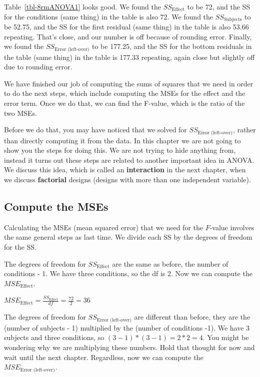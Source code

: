 \documentclass[
  letterpaper,
  DIV=11,
  numbers=noendperiod]{scrreprt}
\begin{document}
Table~\ref{tbl-8rmANOVA1} looks good. We found the \(SS_\text{Effect}\)
to be 72, and the SS for the conditions (same thing) in the table is
also 72. We found the \(SS_\text{Subjects}\) to be 52.75, and the SS for
the first residual (same thing) in the table is also 53.66 repeating.
That's close, and our number is off because of rounding error. Finally,
we found the \(SS_\text{Error (left-over)}\) to be 177.25, and the SS
for the bottom residuals in the table (same thing) in the table is
177.33 repeating, again close but slightly off due to rounding error.

We have finished our job of computing the sums of squares that we need
in order to do the next steps, which include computing the MSEs for the
effect and the error term. Once we do that, we can find the F-value,
which is the ratio of the two MSEs.

Before we do that, you may have noticed that we solved for
\(SS_\text{Error (left-over)}\), rather than directly computing it from
the data. In this chapter we are not going to show you the steps for
doing this. We are not trying to hide anything from, instead it turns
out these steps are related to another important idea in ANOVA. We
discuss this idea, which is called an \textbf{interaction} in the next
chapter, when we discuss \textbf{factorial} designs (designs with more
than one independent variable).

\subsection{Compute the MSEs}\label{compute-the-mses}

Calculating the MSEs (mean squared error) that we need for the
\(F\)-value involves the same general steps as last time. We divide each
SS by the degrees of freedom for the SS.

The degrees of freedom for \(SS_\text{Effect}\) are the same as before,
the number of conditions - 1. We have three conditions, so the df is 2.
Now we can compute the \(MSE_\text{Effect}\).

\(MSE_\text{Effect} = \frac{SS_\text{Effect}}{df} = \frac{72}{2} = 36\)

The degrees of freedom for \(SS_\text{Error (left-over)}\) are different
than before, they are the (number of subjects - 1) multiplied by the
(number of conditions -1). We have 3 subjects and three conditions, so
\((3-1) * (3-1) = 2*2 =4\). You might be wondering why we are
multiplying these numbers. Hold that thought for now and wait until the
next chapter. Regardless, now we can compute the
\(MSE_\text{Error (left-over)}\).
\end{document}
